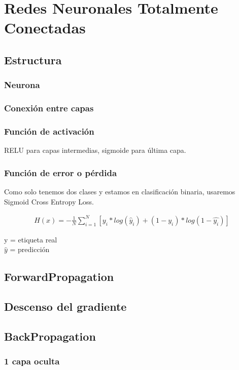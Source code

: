 \chapter{Redes Neuronales Totalmente Conectadas}

\section{Estructura}

\subsection{Neurona}
\subsection{Conexión entre capas}
\subsection{Función de activación}

RELU para capas intermedias, sigmoide para última capa.

\subsection{Función de error o pérdida}

Como solo tenemos dos clases y estamos en clasificación binaria, usaremos Sigmoid Cross Entropy Loss.

\begin{gather}
   H(x) = - \frac{1}{N} \sum_{i=1}^{N}  [y_i * log( \hat{y}_i) + (1-y_i)*log(1-\hat{y_i})]
\end{gather}

y = etiqueta real \\
$\hat{y}$ = predicción 

\section{ForwardPropagation}
\section{Descenso del gradiente}
\section{BackPropagation}
\subsection{1 capa oculta}

